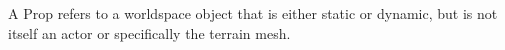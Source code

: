 A Prop refers to a worldspace object that is either static or dynamic, but is not itself an actor or specifically the terrain mesh.

